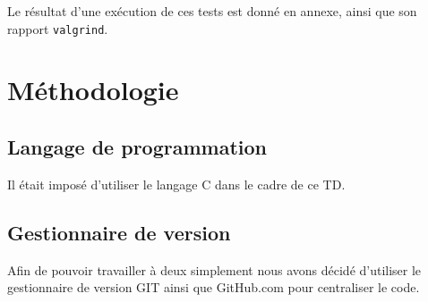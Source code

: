 \documentclass[a4paper,11pt] {article}
\begin{document}
Le résultat d'une exécution de ces tests est donné en annexe, ainsi que son rapport \verb?valgrind?.\\

\section{Méthodologie}
\subsection{Langage de programmation}
Il était imposé d'utiliser le langage C dans le cadre de ce TD.
\subsection{Gestionnaire de version}
Afin de pouvoir travailler à deux simplement nous avons décidé d'utiliser le gestionnaire de version GIT ainsi que GitHub.com pour centraliser le code.
\end{document}
